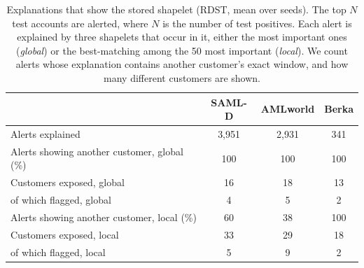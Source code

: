 \begin{table}[t]
\caption{Explanations that show the stored shapelet (RDST, mean over seeds). The top $N$ test accounts are alerted, where $N$ is the number of test positives. Each alert is explained by three shapelets that occur in it, either the most important ones (\emph{global}) or the best-matching among the 50 most important (\emph{local}). We count alerts whose explanation contains another customer's exact window, and how many different customers are shown.}
\label{tab:expl}
\small\setlength{\tabcolsep}{2.5pt}
\centering
\begin{tabular}{lccc}
\toprule
& SAML-D & AMLworld & Berka \\
\midrule
Alerts explained & 3,951 & 2,931 & 341 \\
Alerts showing another customer, global (\%) & 100 & 100 & 100 \\
Customers exposed, global & 16 & 18 & 13 \\
\quad of which flagged, global & 4 & 5 & 2 \\
Alerts showing another customer, local (\%) & 60 & 38 & 100 \\
Customers exposed, local & 33 & 29 & 18 \\
\quad of which flagged, local & 5 & 9 & 2 \\
\bottomrule\end{tabular}\end{table}
